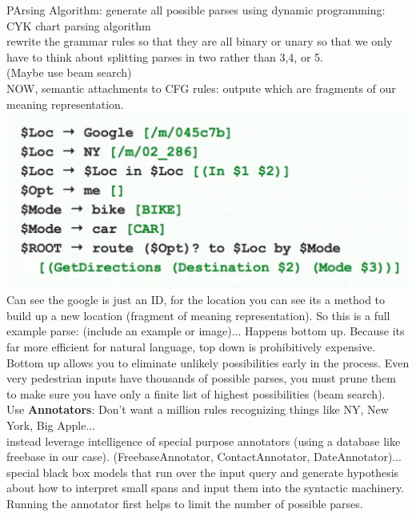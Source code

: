 \documentclass[pageno]{jpaper}
\begin{document}
 PArsing Algorithm:
 generate all possible parses using dynamic programming: CYK chart parsing algorithm \\
 rewrite the grammar rules so that they are all binary or unary so that we only have to think about splitting parses in two rather than 3,4, or 5.\\
 (Maybe use beam search)\\
 NOW, semantic attachments to CFG rules: outpute which are fragments of our meaning representation.\\
 \includegraphics[scale=.28]{imgs/sem_attach.jpeg}
\\
Can see the google is just an ID, for the location you can see its a method to build up a new location (fragment of meaning representation).
So this is a full example parse:
(include an example or image)...
Happens bottom up. Because its far more efficient for natural language, top down is prohibitively expensive. Bottom up allows you to eliminate unlikely possibilities early in the process. Even very pedestrian inputs have thousands of possible parses, you must prune them to make sure you have only a finite list of highest possibilities (beam search).
\\
Use \textbf{Annotators}:
Don't want a million rules recognizing things like NY, New York, Big Apple... 
\\
instead leverage intelligence of special purpose annotators (using a database like freebase in our case). (FreebaseAnnotator, ContactAnnotator, DateAnnotator)... special black box models that run over the input query and generate hypothesis about how to interpret small spans and input them into the syntactic machinery. Running the annotator first helps to limit the number of possible parses.  \\
\end{document}
